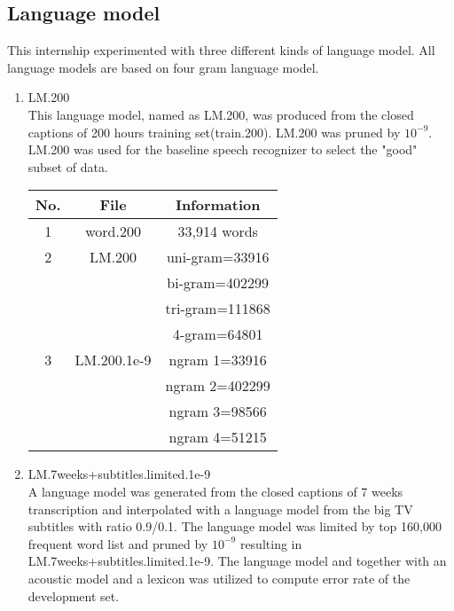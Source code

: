 \subsection{Language model}
This internship experimented with three different kinds of language model. All language models are based on four gram language model. 
\begin{enumerate}
\item LM.200 \\
This language model, named as LM.200, was produced from the closed captions of 200 hours training set(train.200). LM.200 was pruned by $10^{-9}$.  LM.200 was used for the baseline speech recognizer to select the "good" subset of data.

\begin{center}
\begin{tabular}{ | c | c | c | }
\hline
\textbf{No.} & \textbf{File}  & \textbf{Information} \\ \hline \hline
1 & word.200 & 33,914 words \\  \hline
2 & LM.200 & uni-gram=33916 \\ 
 & & bi-gram=402299 \\ 
& & tri-gram=111868 \\  
& & 4-gram=64801 \\  \hline
3 & LM.200.1e-9 & ngram 1=33916 \\  
 & & ngram 2=402299 \\  
& & ngram 3=98566 \\  
& & ngram 4=51215 \\  \hline
\end{tabular}
\end{center}

\item LM.7weeks+subtitles.limited.1e-9 \\
A language model was generated from the closed captions of 7 weeks transcription and interpolated with a language model from the big TV subtitles with ratio 0.9/0.1. The language model was limited by top 160,000 frequent word list and pruned by $10^{-9}$ resulting in LM.7weeks+subtitles.limited.1e-9.  The language model and together with an acoustic model and a lexicon was utilized to compute error rate of the development set.


\end{enumerate}

